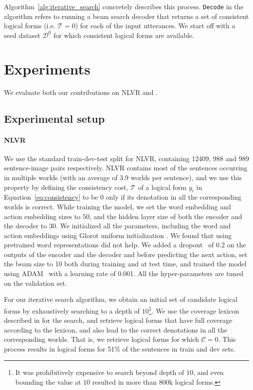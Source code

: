 Algorithm~\ref{alg:iterative_search} concretely describes this process.
\texttt{Decode} in the algorithm refers to running a beam search decoder that
returns a set of consistent logical forms (i.e. $\mathcal{T} = 0$) for each of
the input utterances. We start off with a seed dataset $\mathcal{D}^0$ for which
consistent logical forms are available.

\section{Experiments} \label{sec:experiments}

We evaluate both our contributions on NLVR and \WTQ{}.

\subsection{Experimental setup}
\paragraph{NLVR}
We use the standard
train-dev-test split for NLVR, containing 12409, 988 and 989 sentence-image
pairs respectively. NLVR contains most of the sentences occurring in multiple
worlds (with an average of 3.9 worlds per sentence), and we use this property by
defining the consistency cost, $\mathcal{T}$ of a logical form $y_i$ in
Equation~\ref{eq:consistency} to be 0 only if its denotation in all the
corresponding worlds is correct. While training the model, we set the word
embedding and action embedding sizes to 50, and the hidden layer size of both
the encoder and the decoder to 30. We initialized all the parameters, including
the word and action embeddings using Glorot uniform initialization
\citep{glorot2010understanding}. We found that using pretrained word
representations did not help. We added a dropout~\citep{srivastava2014dropout}
of 0.2 on the outputs of the encoder and the decoder and before predicting the
next action, set the beam size to 10 both during training and at test time, and
trained the model using ADAM~\citep{kingma2014adam} with a learning rate of
0.001. All the hyper-parameters are tuned on the validation set. 

For our iterative search algorithm, we obtain an initial set of candidate
logical forms by exhaustively searching to a depth of $10$\footnote{It was
prohibitively expensive to search beyond depth of $10$, and even bounding the
value at $10$ resulted in more than $800$k logical forms.}. We use the coverage
lexicon described in  for the search, and
retrieve logical forms that have full coverage according to the lexicon, and
also lead to the correct denotations in all the corresponding worlds. That is,
we retrieve logical forms for which $\mathcal{C} = 0$. This process results in
logical forms for 51\% of the sentences in train and dev sets.

